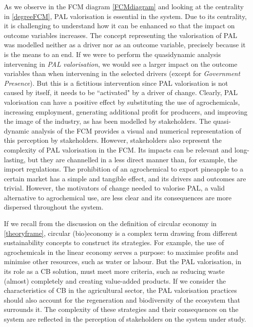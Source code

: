 As we observe in the FCM diagram \cref{FCMdiagram} and looking at the centrality in \cref{degreeFCM}, PAL valorisation is essential in the system. Due to its centrality, it is challenging to understand how it can be enhanced so that the impact on outcome variables increases. The concept representing the valorisation of PAL was modelled neither as a driver nor as an outcome variable, precisely because it is the means to an end. If we were to perform the quasidynamic analysis intervening in \textit{PAL valorisation}, we would see a larger impact on the outcome variables than when intervening in the selected drivers (except for \textit{Government Presence}). But this is a fictitious intervention since PAL valorisation is not caused by itself, it needs to be ``activated" by a driver of change. Clearly, PAL valorisation can have a positive effect by substituting the use of agrochemicals, increasing employment, generating additional profit for producers, and improving the image of the industry, as has been modelled by stakeholders. The quasi-dynamic analysis of the FCM provides a visual and numerical representation of this perception by stakeholders. However, stakeholders also represent the complexity of PAL valorisation in the FCM. Its impacts can be relevant and long-lasting, but they are channelled in a less direct manner than, for example, the import regulations. The prohibition of an agrochemical to export pineapple to a certain market has a simple and tangible effect, and its drivers and outcomes are trivial. However, the motivators of change needed to valorise PAL, a valid alternative to agrochemical use, are less clear and its consequences are more dispersed throughout the system. 

If we recall from the discussion on the definition of circular economy in \cref{theoryframe}, circular (bio)economy is a complex term drawing from different sustainability concepts to construct its strategies. For example, the use of agrochemicals in the linear economy serves a purpose: to maximise profits and minimise other resources, such as water or labour. But the PAL valorisation, in its role as a CB solution, must meet more criteria, such as reducing waste (almost) completely and creating value-added products. If we consider the characteristics of CB in the agricultural sector, the PAL valorisation practices should also account for the regeneration and biodiversity of the ecosystem that surrounds it. The complexity of these strategies and their consequences on the system are reflected in the perception of stakeholders on the system under study. 

